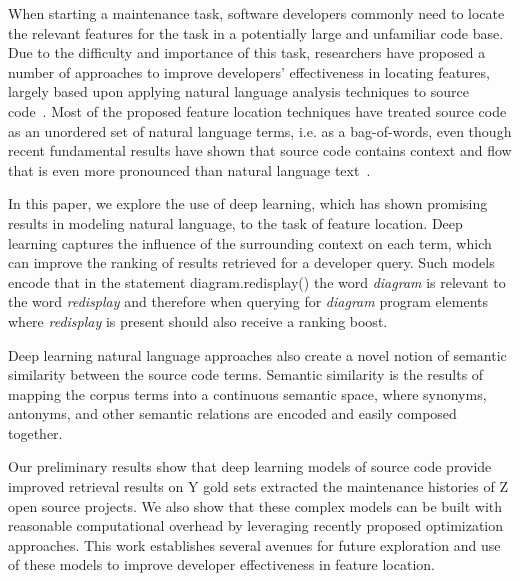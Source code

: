 
% 
%
When starting a maintenance task, software developers commonly need to
locate the relevant features for the task in a potentially large and
unfamiliar code base. Due to the difficulty and importance of this
task, researchers have proposed a number of approaches to improve
developers' effectiveness in locating features, largely based upon
applying natural language analysis techniques to source
code~\cite{dit_feature_2013}. Most of the proposed feature location
techniques have treated source code as an unordered set of natural
language terms, i.e. as a bag-of-words, even though recent fundamental
results have shown that source code contains context and flow that is
even more pronounced than natural language
text~\cite{hindle_naturalness_2012}.


%
%
In this paper, we explore the use of deep learning, which has shown
promising results in modeling natural language, to the task of feature
location. Deep learning captures the influence of the surrounding
context on each term, which can improve the ranking of results
retrieved for a developer query. Such models encode that in the
statement {\sf diagram.redisplay()} the word {\em diagram} is relevant
to the word {\em redisplay} and therefore when querying for {\em
diagram} program elements where {\em redisplay} is present should also
receive a ranking boost.

Deep learning natural language approaches also create a novel notion
of semantic similarity between the source code terms. Semantic
similarity is the results of mapping the corpus terms into a
continuous semantic space, where synonyms, antonyms, and other
semantic relations are encoded and easily composed together.



%
%

Our preliminary results show that deep learning models of source code
provide improved retrieval results on Y gold sets extracted the
maintenance histories of Z open source projects. We also show that these
complex models can be built with reasonable computational overhead by
leveraging recently proposed optimization approaches. This work
establishes several avenues for future exploration and use of these
models to improve developer effectiveness in feature location.



